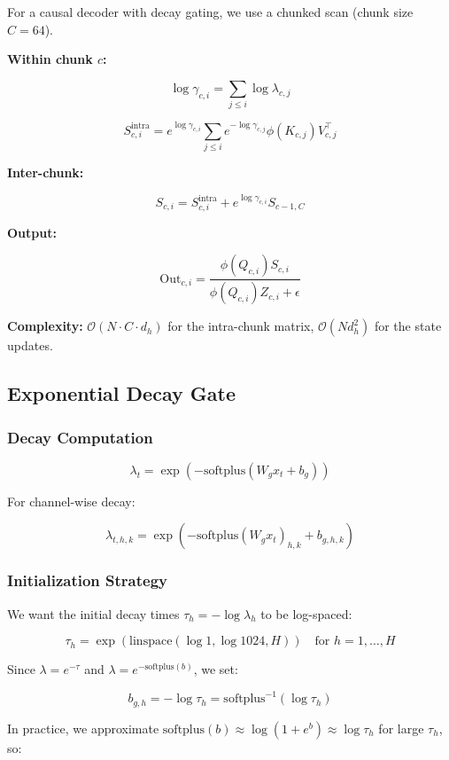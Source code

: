 For a causal decoder with decay gating, we use a chunked scan (chunk size $C = 64$).

\textbf{Within chunk $c$:}

\[
\log \gamma_{c, i} = \sum_{j \leq i} \log \lambda_{c, j}
\tag{4.6}
\]

\[
S_{c, i}^{\text{intra}} = e^{\log \gamma_{c, i}} \sum_{j \leq i} e^{-\log \gamma_{c, j}} \phi(K_{c, j}) V_{c, j}^\top
\tag{4.7}
\]

\textbf{Inter-chunk:}

\[
S_{c, i} = S_{c, i}^{\text{intra}} + e^{\log \gamma_{c, i}} S_{c-1, C}
\tag{4.8}
\]

\textbf{Output:}

\[
\text{Out}_{c, i} = \frac{\phi(Q_{c, i}) S_{c, i}}{\phi(Q_{c, i}) Z_{c, i} + \epsilon}
\tag{4.9}
\]

\textbf{Complexity:} $\mathcal{O}(N \cdot C \cdot d_h)$ for the intra-chunk matrix, 
$\mathcal{O}(N d_h^2)$ for the state updates.

\subsection{Exponential Decay Gate}

\subsubsection{Decay Computation}

\[
\lambda_t = \exp(-\text{softplus}(W_g x_t + b_g))
\tag{4.10}
\]

For channel-wise decay:

\[
\lambda_{t, h, k} = \exp(-\text{softplus}(W_g x_t)_{h, k} + b_{g, h, k})
\tag{4.11}
\]

\subsubsection{Initialization Strategy}

We want the initial decay times $\tau_{h} = -\log \lambda_h$ to be log-spaced:

\[
\tau_h = \exp\!\left(\text{linspace}(\log 1, \log 1024, H)\right) \quad \text{for } h = 1, \dots, H
\tag{4.12}
\]

Since $\lambda = e^{-\tau}$ and $\lambda = e^{-\text{softplus}(b)}$, we set:

\[
b_{g, h} = -\log \tau_h = \text{softplus}^{-1}(\log \tau_h)
\tag{4.13}
\]

In practice, we approximate $\text{softplus}(b) \approx \log(1 + e^b) \approx \log \tau_h$ for large $\tau_h$, so:

